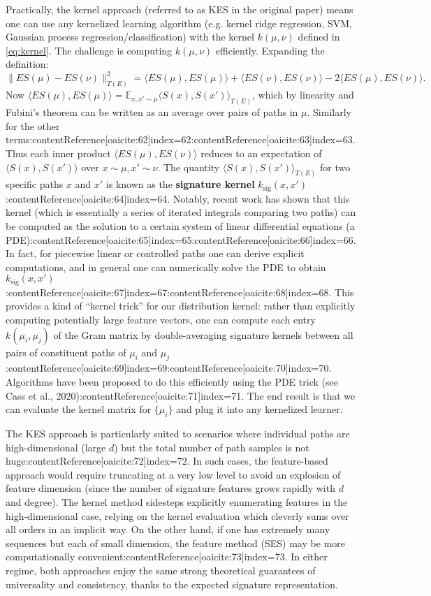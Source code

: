 \documentclass[11pt]{article}
\begin{document}
Practically, the kernel approach (referred to as KES in the original paper) means one can use any kernelized learning algorithm (e.g. kernel ridge regression, SVM, Gaussian process regression/classification) with the kernel $k(\mu,\nu)$ defined in \eqref{eq:kernel}. The challenge is computing $k(\mu,\nu)$ efficiently. Expanding the definition: 
\[
\|ES(\mu) - ES(\nu)\|^2_{T(E)} = \langle ES(\mu), ES(\mu)\rangle + \langle ES(\nu), ES(\nu)\rangle - 2\langle ES(\mu), ES(\nu)\rangle.
\] 
Now $\langle ES(\mu), ES(\mu)\rangle = \mathbb{E}_{x,x'\sim \mu}\langle S(x), S(x')\rangle_{T(E)}$, which by linearity and Fubini’s theorem can be written as an average over pairs of paths in $\mu$. Similarly for the other terms:contentReference[oaicite:62]{index=62}:contentReference[oaicite:63]{index=63}. Thus each inner product $\langle ES(\mu), ES(\nu)\rangle$ reduces to an expectation of $\langle S(x), S(x')\rangle$ over $x\sim\mu, x'\sim\nu$. The quantity $\langle S(x), S(x')\rangle_{T(E)}$ for two specific paths $x$ and $x'$ is known as the \textbf{signature kernel} $k_{\mathrm{sig}}(x,x')$:contentReference[oaicite:64]{index=64}. Notably, recent work has shown that this kernel (which is essentially a series of iterated integrals comparing two paths) can be computed as the solution to a certain system of linear differential equations (a PDE):contentReference[oaicite:65]{index=65}:contentReference[oaicite:66]{index=66}. In fact, for piecewise linear or controlled paths one can derive explicit computations, and in general one can numerically solve the PDE to obtain $k_{\mathrm{sig}}(x,x')$:contentReference[oaicite:67]{index=67}:contentReference[oaicite:68]{index=68}. This provides a kind of ``kernel trick'' for our distribution kernel: rather than explicitly computing potentially large feature vectors, one can compute each entry $k(\mu_i,\mu_j)$ of the Gram matrix by double-averaging signature kernels between all pairs of constituent paths of $\mu_i$ and $\mu_j$:contentReference[oaicite:69]{index=69}:contentReference[oaicite:70]{index=70}. Algorithms have been proposed to do this efficiently using the PDE trick (see Cass et al., 2020):contentReference[oaicite:71]{index=71}. The end result is that we can evaluate the kernel matrix for $\{\mu_i\}$ and plug it into any kernelized learner.

The KES approach is particularly suited to scenarios where individual paths are high-dimensional (large $d$) but the total number of path samples is not huge:contentReference[oaicite:72]{index=72}. In such cases, the feature-based approach would require truncating at a very low level to avoid an explosion of feature dimension (since the number of signature features grows rapidly with $d$ and degree). The kernel method sidesteps explicitly enumerating features in the high-dimensional case, relying on the kernel evaluation which cleverly sums over all orders in an implicit way. On the other hand, if one has extremely many sequences but each of small dimension, the feature method (SES) may be more computationally convenient:contentReference[oaicite:73]{index=73}. In either regime, both approaches enjoy the same strong theoretical guarantees of universality and consistency, thanks to the expected signature representation.
\end{document}
